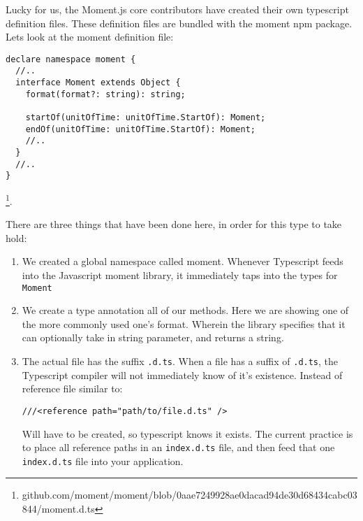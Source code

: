 Lucky for us, the Moment.js core contributors have created their own typescript definition files. These definition files are bundled with the moment npm package. Lets look at the moment definition file:

\begin{lstlisting}[caption=moment.d.ts currently at the time of writing 736 lines long chockfull with interfaces for the Moment library]
declare namespace moment {
  //..
  interface Moment extends Object {
    format(format?: string): string;

    startOf(unitOfTime: unitOfTime.StartOf): Moment;
    endOf(unitOfTime: unitOfTime.StartOf): Moment;
    //..
  }
  //..
}
\end{lstlisting}
\footnote{github.com/moment/moment/blob/0aae7249928ae0dacad94de30d68434cabc03844/moment.d.ts}.  

There are three things that have been done here, in order for this type to take hold:
\begin{enumerate}
\item We created a global namespace called moment. Whenever Typescript feeds into the Javascript moment library, it immediately taps into the types for \lstinline{Moment}
\item We create a type annotation all of our methods. Here we are showing one of the more commonly used one's format. Wherein the library specifies that it can optionally take in string parameter, and returns a string.
\item The actual file has the suffix \lstinline{.d.ts}. When a file has a suffix of \lstinline{.d.ts}, the Typescript compiler will not immediately know of it's existence. Instead of reference file similar to: 
\begin{verbatim} 
///<reference path="path/to/file.d.ts" />
\end{verbatim} 
Will have to be created, so typescript knows it exists. The current practice is to place all reference paths in an \lstinline{index.d.ts} file, and then feed that one \lstinline{index.d.ts} file into your application.
\end{enumerate}
